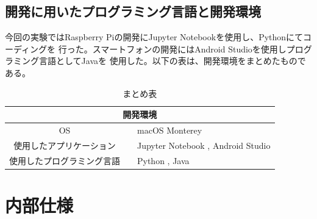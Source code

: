 \documentclass[dvipdfmx,autodetect-engine,titlepage]{jsarticle}
\begin{document}
 
 \subsection{開発に用いたプログラミング言語と開発環境}
 今回の実験ではRaspberry Piの開発にJupyter Notebookを使用し、Pythonにてコーディングを
 行った。スマートフォンの開発にはAndroid Studioを使用しプログラミング言語としてJavaを
 使用した。以下の表は、開発環境をまとめたものである。
 \begin{table}[h]
    \centering
    \caption{まとめ表}
    \begin{tabular}{cll}
    \hline
    \multicolumn{3}{c}{開発環境}                             \\ \hline\hline
    OS            &  & macOS Monterey                    \\ \hline
    使用したアプリケーション  &  & Jupyter Notebook , Android Studio \\ \hline
    使用したプログラミング言語 &  & Python , Java                     \\ \hline
    \end{tabular}
    \end{table}

\section{内部仕様}
\end{document}

